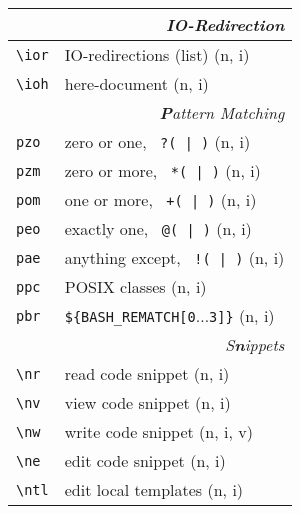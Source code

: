 \documentclass[oneside,11pt,landscape,DIV16]{scrartcl}
\begin{document}
\begin{multicols}{3}
\begin{center}
\begin{tabular}[]{|p{11mm}|p{62mm}|}
\hline
\multicolumn{2}{|r|}{\textsl{\textbf{I}O-Redirection}}                 \\[1.0ex]
\hline \verb'\ior'   & IO-redirections (list)           \hfill (n, i)\\
\hline \verb'\ioh'   & here-document                    \hfill (n, i)\\
\hline
%
\hline
\multicolumn{2}{|r|}{\textsl{\textbf{P}attern Matching}}     \\[1.0ex]
\hline     \verb'pzo' & zero or one,      \verb' ?( | )'  \hfill (n, i)\\ 
\hline     \verb'pzm' & zero or more,     \verb' *( | )'  \hfill (n, i)\\ 
\hline     \verb'pom' & one or more,      \verb' +( | )'  \hfill (n, i)\\ 
\hline     \verb'peo' & exactly one,      \verb' @( | )'  \hfill (n, i)\\ 
\hline     \verb'pae' & anything except,  \verb' !( | )'  \hfill (n, i)\\ 
\hline     \verb'ppc' & POSIX classes                     \hfill (n, i)\\ 
\hline     \verb'pbr' &  \verb'${BASH_REMATCH[0'$\ldots$\verb'3]}'  \hfill (n, i)\\ 
\hline
%
\hline
\multicolumn{2}{|r|}{\textsl{S\textbf{n}ippets}}               \\[1.0ex]
\hline \verb'\nr'  & read code snippet         \hfill (n, i)\\
\hline \verb'\nv'  & view code snippet         \hfill (n, i)\\
\hline \verb'\nw'  & write code snippet        \hfill (n, i, v)\\
\hline \verb'\ne'  & edit code snippet         \hfill (n, i)\\
%
\hline \verb'\ntl' & edit local templates      \hfill (n, i)\\

\end{tabular}
\end{center}
\end{multicols}
\end{document}
